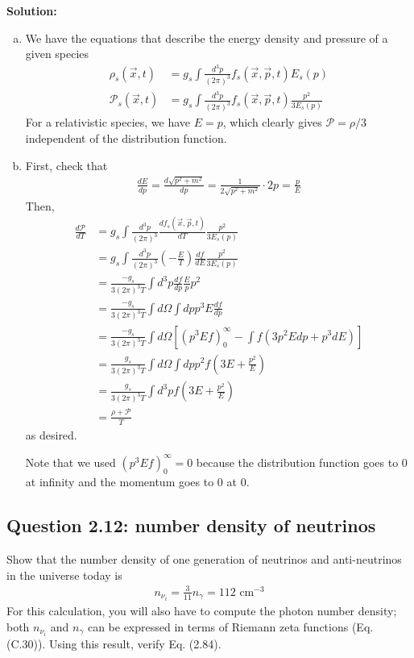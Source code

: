 \documentclass[11pt]{article}
\begin{document}
\textbf{Solution:}
\begin{enumerate}[(a)]
    \item We have the equations that describe the energy density and pressure of a given species 
    \begin{align*}
        \rho_s(\vec{x}, t) &= g_s \int \frac{d^3 p}{(2\pi)^3} f_s(\vec{x}, \vec{p}, t) E_s(p) \\
        \mathcal{P}_s(\vec{x}, t) &= g_s \int \frac{d^3 p}{(2\pi)^3}f_s(\vec{x}, \vec{p}, t) \frac{p^2}{3E_s(p)}
    \end{align*}
    For a relativistic species, we have $E = p$, which clearly gives $\mathcal{P} = \rho/3$ independent of the distribution function. 
    \item First, check that 
    \begin{align*}
        \frac{dE }{dp } = \frac{d\sqrt{p^2 + m^2}}{dp} =  \frac{1}{2\sqrt{p^2 + m^2}}\cdot 2p = \frac{p}{E}
    \end{align*}
    Then, 
    \begin{align*}
        \frac{d\mathcal{P}}{dT} &= g_s \int \frac{d^3 p}{(2\pi)^3} \frac{d f_s(\vec{x}, \vec{p}, t)}{dT} \frac{p^2}{3E_s(p)} \\
        &= g_s \int \frac{d^3p}{(2\pi)^3} \left( - \frac{E}{T}\right) \frac{df }{dE} \frac{p^2}{3E_s(p)} \\
        &= \frac{-g_s}{3(2\pi)^3 T} \int d^3p \frac{df }{dp} \frac{E}{p} p^2 \\
        &=  \frac{-g_s}{3(2\pi)^3 T} \int d\Omega \int dp p^3 E \frac{df}{dp} \\
        &= \frac{-g_s}{3(2\pi)^3 T} \int d\Omega \left[ (p^3Ef)^\infty_0 - \int f (3p^2 Edp + p^3 dE) \right] \\
        &= \frac{g_s}{3(2\pi)^3 T} \int d\Omega \int dp p^2f (3 E + \frac{p^2}{E}) \\
        &= \frac{g_s}{3(2\pi)^3 T} \int d^3p f (3E + \frac{p^2}{E}) \\
        &= \frac{\rho +\mathcal{P}}{T}
    \end{align*}
    as desired. 

    Note that we used $(p^3 E f)^\infty_0 = 0$ because the distribution function goes to 0 at infinity and the momentum goes to 0 at 0. 
\end{enumerate}

\subsection{Question 2.12: number density of neutrinos}
Show that the number density of one generation of neutrinos and anti-neutrinos in the universe today is 
\begin{align*}
    n_{\nu_i} = \frac{3}{11} n_\gamma = 112 \text{ cm}^{-3}
\end{align*}
For this calculation, you will also have to compute the photon number density; both $n_{\nu_i}$ and $n_\gamma$ can be expressed in terms of Riemann zeta functions (Eq. (C.30)). Using this result, verify Eq. (2.84). 
\end{document}
